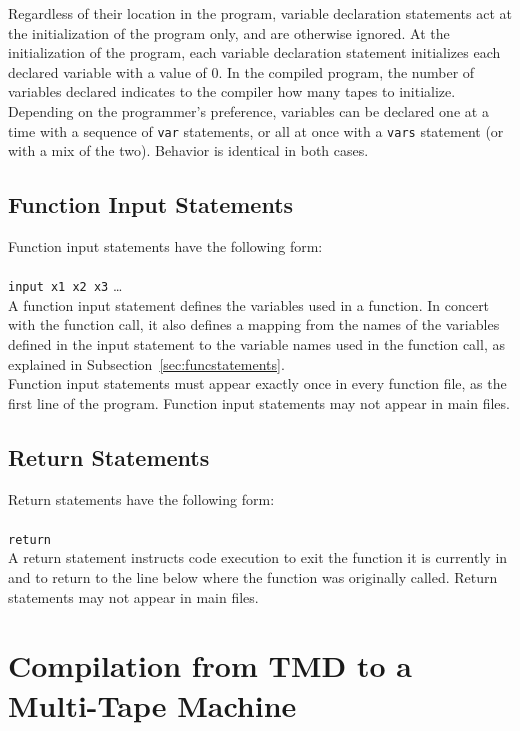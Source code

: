 Regardless of their location in the program, variable declaration statements act at the initialization of the program only, and are otherwise ignored. At the initialization of the program, each variable declaration statement initializes each declared variable with a value of 0. In the compiled program, the number of variables declared indicates to the compiler how many tapes to initialize. \\

Depending on the programmer's preference, variables can be declared one at a time with a sequence of \texttt{var} statements, or all at once with a \texttt{vars} statement (or with a mix of the two). Behavior is identical in both cases.

\subsection{Function Input Statements}

Function input statements have the following form: \\ \\
\texttt{input x1 x2 x3} \dots \\

A function input statement defines the variables used in a function. In concert with the function call, it also defines a mapping from the names of the variables defined in the input statement to the variable names used in the function call, as explained in Subsection~\ref{sec:funcstatements}.\\

Function input statements must appear exactly once in every function file, as the first line of the program. Function input statements may not appear in main files.

\subsection{Return Statements}

Return statements have the following form: \\ \\
\texttt{return} \\

A return statement instructs code execution to exit the function it is currently in and to return to the line below where the function was originally called. Return statements may not appear in main files.

\section{Compilation from TMD to a Multi-Tape Machine} \label{sec:turdtotm}

